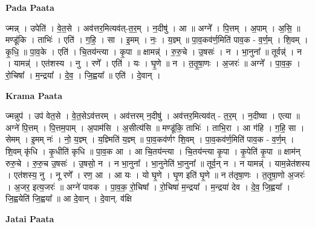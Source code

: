 \documentclass[17pt]{extarticle}
\begin{document}
\textbf{Pada Paata} \newline

ज्मन्न् । उपेति॑ । वे॒त॒से । अव॑त्तर॒मित्यव॑त्-त॒र॒म् । न॒दीषु॑ । आ ॥ अग्ने᳚ । पि॒त्तम् । अ॒पाम् । अ॒सि॒ ॥ मण्डू॑कि । ताभिः॑ । एति॑ । ग॒हि॒ । सा । इ॒मम् । नः॒ । य॒ज्ञ्म् ॥ पा॒व॒कव॑र्ण॒मिति॑ पाव॒क - व॒र्ण॒म् । शि॒वम् । कृ॒धि॒ ॥ पा॒व॒के । एति॑ । चि॒तय॑न्त्या । कृ॒पा ॥ क्षामन्न्॑ । रु॒रु॒चे । उ॒षसः॑ । न । भा॒नुना᳚ ॥ तूर्वन्न्॑ । न । यामन्न्॑ । एत॑शस्य । नु । रणे᳚ । एति॑ । यः । घृ॒णे ॥ न । त॒तृ॒षा॒णः । अ॒जरः॑ ॥ अग्ने᳚ । पा॒व॒क॒ । रो॒चिषा᳚ । म॒न्द्रया᳚ । दे॒व॒ । जि॒ह्वया᳚ ॥ एति॑ । दे॒वान् ।  \newline


\textbf{Krama Paata} \newline

ज्मन्नुप॑ । उप॑ वेत॒से । वे॒त॒सेऽव॑त्तरम् । अव॑त्तरम् न॒दीषु॑ । अव॑त्तर॒मित्यव॑त् - त॒र॒म् । न॒दीष्वा । एत्या ॥ अग्ने॑ पि॒त्तम् । पि॒त्तम॒पाम् । अ॒पाम॑सि । अ॒सीत्य॑सि ॥ मण्डू॑कि॒ ताभिः॑ । ताभि॒रा । आ ग॑हि । ग॒हि॒ सा । सेमम् । इ॒मम् नः॑ । नो॒ य॒ज्ञ्म् । य॒ज्ञ्मिति॑ य॒ज्ञ्म् ॥ पा॒व॒कव॑र्णꣳ शि॒वम् । पा॒व॒कव॑र्ण॒मिति॑ पाव॒क - व॒र्ण॒म् । शि॒वम् कृ॑धि । कृ॒धीति॑ कृधि ॥ पा॒व॒क आ । आ चि॒तय॑न्त्या । चि॒तय॑न्त्या कृ॒पा । कृ॒पेति॑ कृ॒पा ॥ क्षाम॑न् रुरु॒चे । रु॒रु॒च उ॒षसः॑ । उ॒षसो॒ न । न भा॒नुना᳚ । भा॒नुनेति॑ भा॒नुना᳚ ॥ तूर्व॒न् न । न यामन्न्॑ । याम॒न्नेत॑शस्य । एत॑शस्य॒ नु । नू रणे᳚ । रण॒ आ । आ यः । यो घृ॒णे । घृ॒ण इति॑ घृ॒णे ॥ न त॑तृषा॒णः । त॒तृ॒षा॒णो अ॒जरः॑ । अ॒जर॒ इत्य॒जरः॑ ॥ अग्ने॑ पावक । पा॒व॒क॒ रो॒चिषा᳚ । रो॒चिषा॑ म॒न्द्रया᳚ । म॒न्द्रया॑ देव । दे॒व॒ जि॒ह्वया᳚ । जि॒ह्वयेति॑ जि॒ह्वया᳚ ॥ आ दे॒वान् । दे॒वान्. व॑क्षि \newline

\textbf{Jatai Paata} \newline
\end{document}
